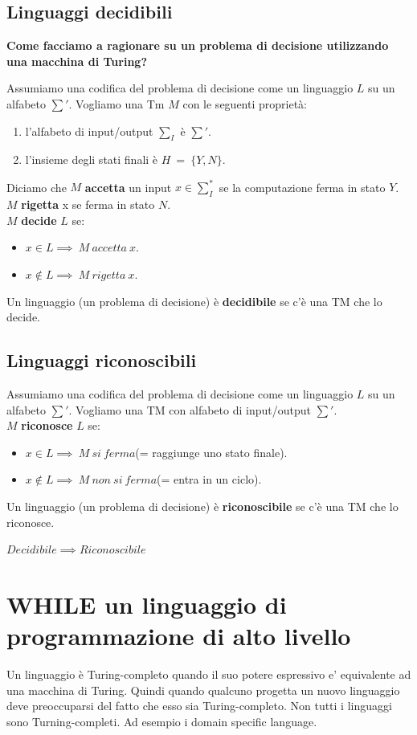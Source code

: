 \documentclass[a4paper, 12pt]{article}
\begin{document}
\subsection{Linguaggi decidibili}
\begin{center}
\textbf{Come facciamo a ragionare su un problema di decisione utilizzando una macchina di Turing?}
\end{center}
Assumiamo una codifica del problema di decisione come un linguaggio $L$ su un alfabeto $\sum'$. Vogliamo una Tm $M$ con le seguenti propriet\`a: \begin{enumerate}
\item l'alfabeto di input/output $\sum_{I}$ \`e $\sum'$.
\item l'insieme degli stati finali \`e $H\ =\ \{Y,N\}$.
\end{enumerate}
Diciamo che $M$ \textbf{accetta} un input $x \in \sum_{I}^{*}$ se la computazione ferma in stato $Y$. $M$ \textbf{rigetta} x se ferma in stato $N$.\\
$M$ \textbf{decide} $L$ se:
\begin{itemize}
\item $x \in L \implies\ M\ accetta\ x.$
\item $x \notin L \implies\ M\ rigetta\ x.$
\end{itemize}
Un linguaggio (un problema di decisione) \`e \textbf{decidibile} se c'\`e una TM che lo decide.
\subsection{Linguaggi riconoscibili}
Assumiamo una codifica del problema di decisione come un linguaggio $L$ su un alfabeto $\sum'$. Vogliamo una TM con alfabeto di input/output $\sum'$.\\
$M$ \textbf{riconosce} $L$ se:
\begin{itemize}
\item $x \in L \implies\ M\ si\ ferma$(= raggiunge uno stato finale).
\item $x \notin L \implies\ M\ non\ si\ ferma$(= entra in un ciclo).
\end{itemize}
Un linguaggio (un problema di decisione) \`e \textbf{riconoscibile} se c'\`e una TM che lo riconosce.\\
\begin{center}
$Decidibile \implies Riconoscibile$
\end{center}
\section{WHILE un linguaggio di programmazione di alto livello	}
Un linguaggio \`e Turing-completo quando il suo potere espressivo e' equivalente ad una macchina di Turing. 
Quindi quando qualcuno progetta un nuovo linguaggio deve preoccuparsi del fatto che esso sia Turing-completo.
Non tutti i linguaggi sono Turning-completi. Ad esempio i domain specific language.
\end{document}
